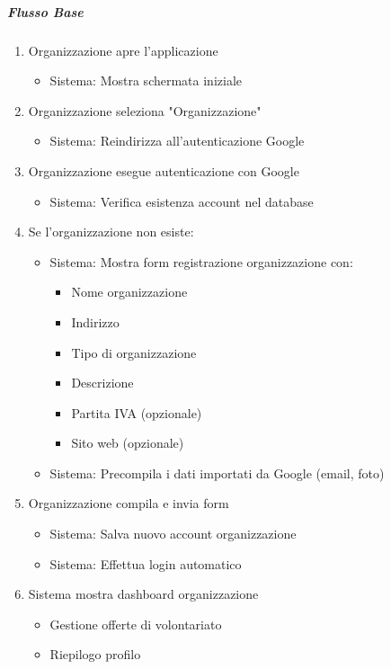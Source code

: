 \subparagraph{Flusso Base}
\begin{enumerate}
\item Organizzazione apre l'applicazione
    \begin{itemize}
        \item Sistema: Mostra schermata iniziale
    \end{itemize}
\item Organizzazione seleziona "Organizzazione"
    \begin{itemize}
        \item Sistema: Reindirizza all'autenticazione Google
    \end{itemize}
\item Organizzazione esegue autenticazione con Google
    \begin{itemize}
        \item Sistema: Verifica esistenza account nel database
    \end{itemize}
\item Se l'organizzazione non esiste:
    \begin{itemize}
        \item Sistema: Mostra form registrazione organizzazione con:
            \begin{itemize}
                \item Nome organizzazione
                \item Indirizzo
                \item Tipo di organizzazione
                \item Descrizione
                \item Partita IVA (opzionale)
                \item Sito web (opzionale)
            \end{itemize}
        \item Sistema: Precompila i dati importati da Google (email, foto)
    \end{itemize}
\item Organizzazione compila e invia form
    \begin{itemize}
        \item Sistema: Salva nuovo account organizzazione
        \item Sistema: Effettua login automatico
    \end{itemize}
\item Sistema mostra dashboard organizzazione
    \begin{itemize}
        \item Gestione offerte di volontariato
        \item Riepilogo profilo
    \end{itemize}
\end{enumerate}

